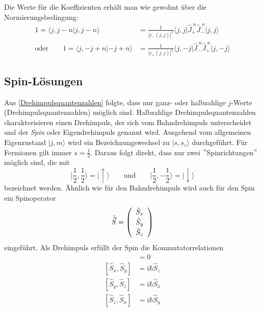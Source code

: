 \documentclass[9pt]{report}
\begin{document}
Die Werte für die Koeffizienten erhält man wie gewohnt über die Normierungsbedingung:
\begin{align}
1=\langle j,j-n|j,j-n\rangle &= \frac{1}{|c_{-}(j,j)|^2}\big\langle j,j\big|\hat{J}_{+}^{\;n}\hat{J}_{-}^{\;n}\big|j,j\big\rangle\\
\mathrm{oder}\qquad 1=\langle j,-j+n|-j+n\rangle &= \frac{1}{|c_{+}(j,j)|^2}\big\langle j,-j\big|\hat{J}_{-}^{\;n}\hat{J}_{+}^{\;n}\big|j,-j\big\rangle
\end{align}





\subsection{Spin-Lösungen}
Aus \eqref{Drehimpulsquantenzahlen} folgte, dass nur ganz- oder halbzahlige $j$-Werte (Drehimpulsquantenzahlen) möglich sind. Halbzahlige Drehimpulsquantenzahlen charakterisieren einen Drehimpuls, der sich vom Bahndrehimpuls unterscheidet und der \textit{Spin} oder Eigendrehimpuls genannt wird. Ausgehend vom allgemeinen Eigenzustand $|j,m\rangle$ wird ein Bezeichnungswechsel zu $|s,s_{z}\rangle$ durchgeführt. Für Fermionen gilt immer $s=\frac{1}{2}$. Daraus folgt direkt, dass nur zwei $"$Spinrichtungen$"$ möglich sind, die mit
\begin{equation}
\bigg|\frac{1}{2},\frac{1}{2}\bigg\rangle=\big|\uparrow\big\rangle\qquad\mathrm{und}\qquad\bigg|\frac{1}{2},-\frac{1}{2}\bigg\rangle=\big|\downarrow\big\rangle
\end{equation}
bezeichnet werden. Ähnlich wie für den Bahndrehimpuls wird auch für den Spin ein Spinoperator
\begin{equation}
\hat{\vec{S}}=
\renewcommand{\arraystretch}{1.2}
\left(\begin{array}{c} \hat{S}_{x} \\ \hat{S}_{y} \\ \hat{S}_{z} \\\end{array}\right)
\end{equation}
eingeführt. Als Drehimpuls erfüllt der Spin die Kommutatorrelationen
\begin{align}
[\hat{\vec{S}}^{\,2},\hat{S}_{i}] &= 0 \\
[\hat{S}_{x},\hat{S}_{y}] &= \mathrm{i}\hbar\hat{S}_{z} \\
[\hat{S}_{y},\hat{S}_{z}] &= \mathrm{i}\hbar\hat{S}_{x} \\
[\hat{S}_{z},\hat{S}_{x}] &= \mathrm{i}\hbar\hat{S}_{y}
\end{align}
\end{document}
